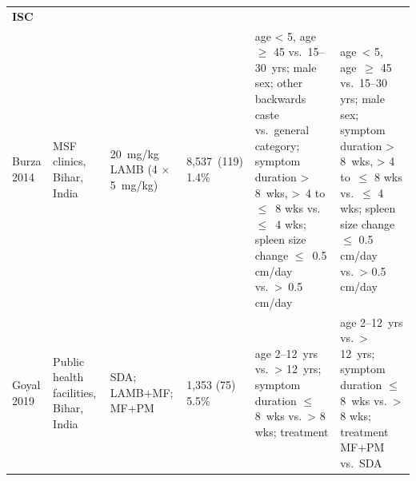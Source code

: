 {\begin{landscape}
\begin{ThreePartTable}
\begin{longtable}[c]{@{} L{3.1cm} L{2.5cm} L{2cm} L{1.7cm} L{6cm} L{6cm} @{}}
      \textbf{ISC}                                 &                                                                   &                                    &                      &                                                                                                                                                                                                                                                                                                                                   &                                                                                                                                                                                                                                             \\
      \hspace{0.5em}Burza 2014\cite{burza2014}     & MSF clinics, Bihar, India                                         & 20~mg/kg LAMB (4 $\times$ 5~mg/kg) & 8,537~(119) 1.4\%    & age < 5\mtnote{****}, age $\geq$ 45\mtnote{**} vs.\ 15--30~yrs; male sex\mtnote{***}; other backwards caste\mtnote{*} vs.\ general category; symptom duration > 8~wks\mtnote{***}, >~4 to $\leq$~8 wks\mtnote{**} vs.\ $\leq$~4 wks; spleen size change $\leq$~0.5 cm/day vs.\ >~0.5 cm/day                              & age~< 5\mtnote{****}, age~$\geq$ 45\mtnote{**} vs.\ 15--30 yrs; male sex\mtnote{***}; symptom duration > 8~wks\mtnote{**}, > 4 to~$\leq$ 8 wks\mtnote{**} vs.\ $\leq$ 4 wks; spleen size change $\leq$ 0.5 cm/day vs.~> 0.5 cm/day \\
      \hspace{0.5em}Goyal 2019\cite{goyal2019}     & Public health facilities, Bihar, India                            & SDA; LAMB+MF; MF+PM                & 1,353 (75) 5.5\%     & age 2--12~yrs\mtnote{**} vs.\ > 12~yrs; symptom duration $\leq$ 8~wks\mtnote{***} vs.\ > 8 wks; treatment\mtnote{****}                                                                                                                                                                                                            & age 2--12~yrs\mtnote{$\dagger$} vs.\ > 12~yrs; symptom duration $\leq$ 8~wks\mtnote{$\dagger$} vs.\ > 8 wks; treatment MF+PM\mtnote{$\dagger$} vs.\ SDA                                                                                     \\

\end{longtable}
\end{ThreePartTable}
\end{landscape}}
